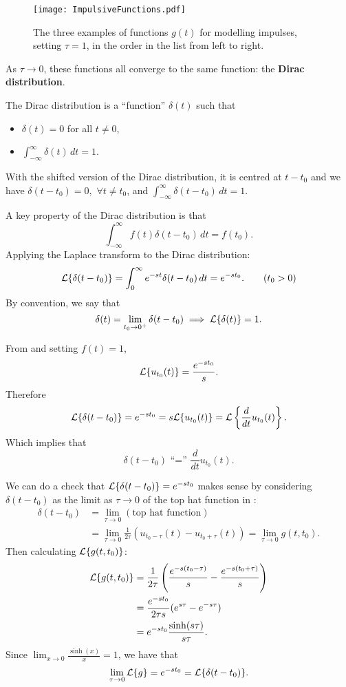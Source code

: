 \begin{figure}[!ht]
	\centering
	\texttt{[image: ImpulsiveFunctions.pdf]}
	\caption{The three examples of functions $g(t)$ for modelling impulses, setting $\tau=1$, in the order in the list from left to right.}
	\label{fig:impulsivefuncs}
\end{figure}

As $\tau \to 0$, these functions all converge to the same function: the \textbf{Dirac distribution}.

\begin{definition}
	The Dirac distribution is a ``function'' $\delta(t)$ such that
	\begin{itemize}
		\item $\delta(t)=0$ for all $t \neq 0$,
		\item $\int_{-\infty}^{\infty} \delta(t)\,dt = 1$.
	\end{itemize}
\end{definition}

With the shifted version of the Dirac distribution, it is centred at $t-t_0$ and we have $\delta(t-t_0)=0, \,\, \forall t\neq t_0$, and $\int_{-\infty}^{\infty} \delta(t-t_0)\,dt = 1$.

A key property of the Dirac distribution is that
\[
\int_{-\infty}^{\infty} f(t)\delta(t-t_0)\,dt = f(t_0).
\]
Applying the Laplace transform to the Dirac distribution:
\begin{equation*}
	\mathcal{L}\{\delta(t-t_0)\} = \int_0^{\infty} e^{-st}\delta(t-t_0) \,dt = e^{-st_0}. \tag{$t_0>0$}
\end{equation*}
By convention, we say that
\[
\delta(t) = \lim_{t_0 \to 0^+}\delta(t-t_0) \implies \mathcal{L}\{\delta(t)\} = 1.
\]

\begin{remark}
	From  and setting $f(t)=1$,
	\[
	\mathcal{L}\{u_{t_0}(t)\} = \frac{e^{-st_0}}{s}.
	\]
	Therefore
	\[
	\mathcal{L}\{\delta(t-t_0)\} = e^{-st_0} = s\mathcal{L}\{u_{t_0}(t)\} = \mathcal{L}\left\{\frac{d}{dt}u_{t_0}(t)\right\}.
	\]
	Which implies that
	\[
	\text{$\delta(t-t_0)$ ``='' $\frac{d}{dt}u_{t_0}(t).$}
	\]
\end{remark}

We can do a check that $\mathcal{L}\{\delta(t-t_0)\} = e^{-st_0}$ makes sense by considering $\delta(t-t_0)$ as the limit as $\tau\to0$ of the top hat function in :
\begin{align*}
	\delta(t-t_0) &= \lim_{\tau\to0} (\text{top hat function}) \\
	&= \lim_{\tau\to0} \frac{1}{2\tau}\left(u_{t_0-\tau}(t) - u_{t_0+\tau}(t)\right) = \lim_{\tau\to0} g(t,t_0).
\end{align*}
Then calculating $\mathcal{L}\{g(t,t_0)\}$:
\begin{align*}
	\mathcal{L}\{g(t,t_0)\} &= \frac{1}{2\tau} \left(\frac{e^{-s(t_0-\tau)}}{s} - \frac{e^{-s(t_0+\tau)}}{s}\right) \\
	&= \frac{e^{-st_0}}{2\tau s} (e^{s\tau}-e^{-s\tau}) \\
	&= e^{-st_0} \frac{\sinh(s\tau)}{s\tau}.
\end{align*}
Since $\lim_{x\to0} \frac{\sinh(x)}{x} = 1$, we have that
\[
\lim_{\tau\to0} \mathcal{L}\{g\} = e^{-st_0} = \mathcal{L}\{\delta(t-t_0)\}.
\]


